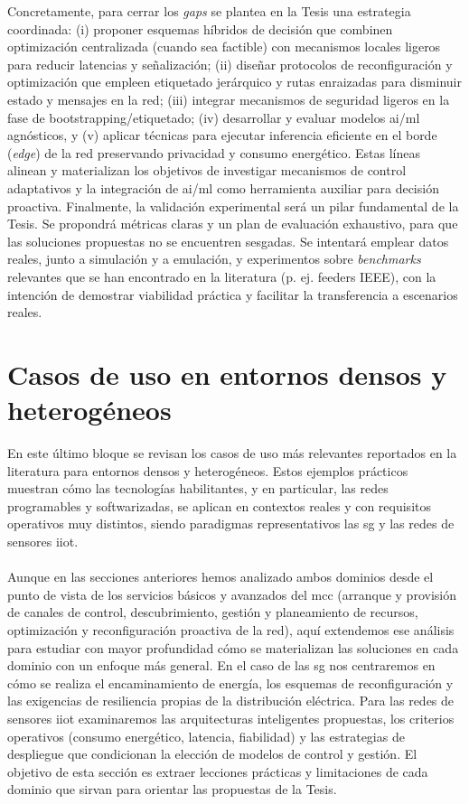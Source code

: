 Concretamente, para cerrar los \emph{gaps} se plantea en la Tesis una estrategia coordinada: (i) proponer esquemas híbridos de decisión que combinen optimización centralizada (cuando sea factible) con mecanismos locales ligeros para reducir latencias y señalización; (ii) diseñar protocolos de reconfiguración y optimización que empleen etiquetado jerárquico y rutas enraizadas para disminuir estado y mensajes en la red; (iii) integrar mecanismos de seguridad ligeros en la fase de bootstrapping/etiquetado; (iv) desarrollar y evaluar modelos \gls{ai}/\gls{ml} agnósticos, y (v) aplicar técnicas para ejecutar inferencia eficiente en el borde (\textit{edge}) de la red preservando privacidad y consumo energético. Estas líneas alinean y materializan los objetivos de investigar mecanismos de control adaptativos y la integración de \gls{ai}/\gls{ml} como herramienta auxiliar para decisión proactiva. Finalmente, la validación experimental será un pilar fundamental de la Tesis. Se propondrá métricas claras y un plan de evaluación exhaustivo, para que las soluciones propuestas no se encuentren sesgadas. Se intentará emplear datos reales, junto a simulación y a  emulación, y experimentos sobre \textit{benchmarks} relevantes que se han encontrado en la literatura (p. ej. feeders IEEE), con la intención de demostrar viabilidad práctica y facilitar la transferencia a escenarios reales. 




\section{Casos de uso en entornos densos y heterogéneos}  
\label{sec:casos_de_uso}

En este último bloque se revisan los casos de uso más relevantes reportados en la literatura para entornos densos y heterogéneos. Estos ejemplos prácticos muestran cómo las tecnologías habilitantes, y en particular, las redes programables y softwarizadas, se aplican en contextos reales y con requisitos operativos muy distintos, siendo paradigmas representativos las \gls{sg} y las redes de sensores \gls{iiot}.\\
\\
Aunque en las secciones anteriores hemos analizado ambos dominios desde el punto de vista de los servicios básicos y avanzados del \gls{mcc} (arranque y provisión de canales de control, descubrimiento, gestión y planeamiento de recursos, optimización y reconfiguración proactiva de la red), aquí extendemos ese análisis para estudiar con mayor profundidad cómo se materializan las soluciones en cada dominio con un enfoque más general. En el caso de las \gls{sg} nos centraremos en cómo se realiza el encaminamiento de energía, los esquemas de reconfiguración y las exigencias de resiliencia propias de la distribución eléctrica. Para las redes de sensores \gls{iiot} examinaremos las arquitecturas inteligentes propuestas, los criterios operativos (consumo energético, latencia, fiabilidad) y las estrategias de despliegue que condicionan la elección de modelos de control y gestión. El objetivo de esta sección es extraer lecciones prácticas y limitaciones de cada dominio que sirvan para orientar las propuestas de la Tesis.



